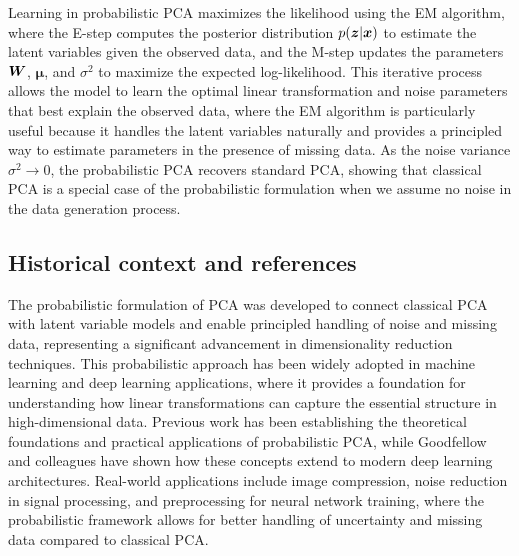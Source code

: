 Learning in probabilistic PCA maximizes the likelihood using the EM algorithm, where the E-step computes the posterior distribution $p(\boldsymbol{z}|\boldsymbol{x})$ to estimate the latent variables given the observed data, and the M-step updates the parameters $\boldsymbol{W}$, $\boldsymbol{\mu}$, and $\sigma^2$ to maximize the expected log-likelihood. This iterative process allows the model to learn the optimal linear transformation and noise parameters that best explain the observed data, where the EM algorithm is particularly useful because it handles the latent variables naturally and provides a principled way to estimate parameters in the presence of missing data. As the noise variance $\sigma^2 \to 0$, the probabilistic PCA recovers standard PCA, showing that classical PCA is a special case of the probabilistic formulation when we assume no noise in the data generation process.



\subsection{Historical context and references}

The probabilistic formulation of PCA was developed to connect classical PCA with latent variable models and enable principled handling of noise and missing data, representing a significant advancement in dimensionality reduction techniques. This probabilistic approach has been widely adopted in machine learning and deep learning applications, where it provides a foundation for understanding how linear transformations can capture the essential structure in high-dimensional data. Previous work has been establishing the theoretical foundations and practical applications of probabilistic PCA, while Goodfellow and colleagues have shown how these concepts extend to modern deep learning architectures. Real-world applications include image compression, noise reduction in signal processing, and preprocessing for neural network training, where the probabilistic framework allows for better handling of uncertainty and missing data compared to classical PCA.
